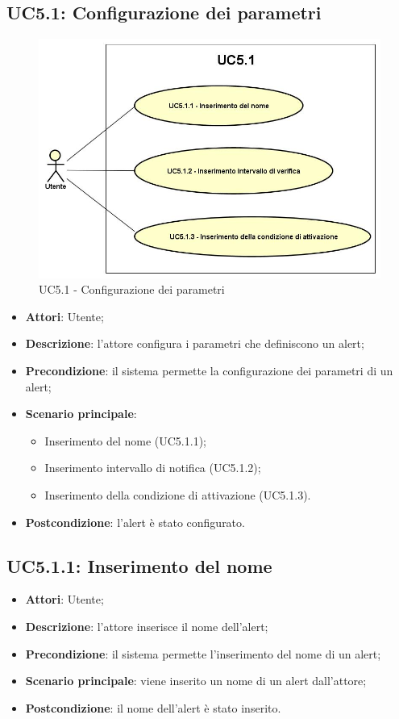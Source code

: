 \subsection{UC5.1: Configurazione dei parametri}
\hypertarget{UC5.1}{}
\begin{figure} [H]
	\centering
	\includegraphics[scale=0.45]{Img/UC5-1}
	\caption{UC5.1 - Configurazione dei parametri}\label{}
\end{figure}
\begin{itemize}
	\item \textbf{Attori}: Utente;
	\item \textbf{Descrizione}: l'attore configura i parametri che definiscono un alert;
	\item \textbf{Precondizione}: il sistema permette la configurazione dei parametri di un alert;
	\item \textbf{Scenario principale}:
	\begin{itemize}
		\item Inserimento del nome (UC5.1.1);
		\item Inserimento intervallo di notifica (UC5.1.2);
		\item Inserimento della condizione di attivazione (UC5.1.3).
	\end{itemize}
	\item \textbf{Postcondizione}: l'alert è stato configurato.
\end{itemize}

\subsection{UC5.1.1: Inserimento del nome}
\hypertarget{UC5.1.1}{}
\begin{itemize}
	\item \textbf{Attori}: Utente;
	\item \textbf{Descrizione}: l'attore inserisce il nome dell'alert;
	\item \textbf{Precondizione}: il sistema permette l'inserimento del nome di un alert;
	\item \textbf{Scenario principale}: viene inserito un nome di un alert dall'attore;
	\item \textbf{Postcondizione}: il nome dell'alert è stato inserito.
\end{itemize}

